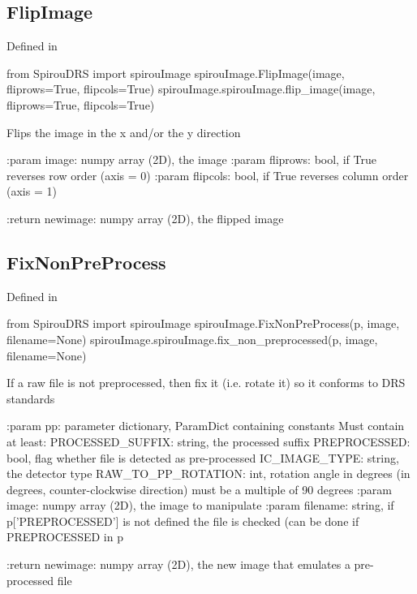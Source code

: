 \noindent\begin{minipage}{\textwidth}
\subsection{FlipImage}

Defined in \spirouImage{}

\begin{pythonbox}
from SpirouDRS import spirouImage
spirouImage.FlipImage(image, fliprows=True, flipcols=True)
spirouImage.spirouImage.flip_image(image, fliprows=True, flipcols=True)
\end{pythonbox}

\begin{pythondocstring}
Flips the image in the x and/or the y direction

:param image: numpy array (2D), the image
:param fliprows: bool, if True reverses row order (axis = 0)
:param flipcols: bool, if True reverses column order (axis = 1)

:return newimage: numpy array (2D), the flipped image
\end{pythondocstring}
\end{minipage}


\noindent\begin{minipage}{\textwidth}
\subsection{FixNonPreProcess}

Defined in \spirouImage{}

\begin{pythonbox}
from SpirouDRS import spirouImage
spirouImage.FixNonPreProcess(p, image, filename=None)
spirouImage.spirouImage.fix_non_preprocessed(p, image, filename=None)
\end{pythonbox}

\begin{pythondocstring}
If a raw file is not preprocessed, then fix it (i.e. rotate it) so
it conforms to DRS standards

:param pp: parameter dictionary, ParamDict containing constants
    Must contain at least:
        PROCESSED_SUFFIX: string, the processed suffix
        PREPROCESSED: bool, flag whether file is detected as
                      pre-processed
        IC_IMAGE_TYPE: string, the detector type
        RAW_TO_PP_ROTATION: int, rotation angle in degrees (in degrees,
                            counter-clockwise direction) must be a multiple
                            of 90 degrees
:param image: numpy array (2D), the image to manipulate
:param filename: string, if p['PREPROCESSED'] is not defined the file
                 is checked (can be done if PREPROCESSED in p

:return newimage: numpy array (2D), the new image that emulates a pre-
                  processed file
\end{pythondocstring}
\end{minipage}

